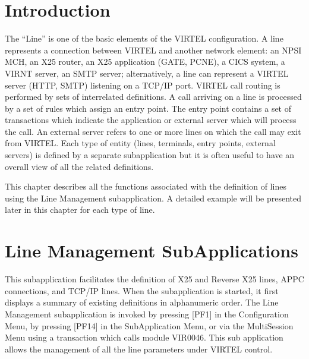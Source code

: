 \documentclass[letterpaper,10pt,english]{sphinxmanual}
\begin{document}
\section{Introduction}
\label{\detokenize{connectivity_guide:introduction}}
\sphinxAtStartPar
The “Line” is one of the basic elements of the VIRTEL configuration. A line represents a connection between VIRTEL and another network element: an NPSI MCH, an X25 router, an X25 application (GATE, PCNE), a CICS system, a VIRNT server, an SMTP server; alternatively, a line can represent a VIRTEL server (HTTP, SMTP) listening on a TCP/IP port. VIRTEL call routing is performed by sets of interrelated definitions. A call arriving on a line is processed by a set of rules which assign an entry point. The entry point contains a set of transactions which indicate the application or external server which will process the call. An external server refers to one or more lines on which the call may exit from VIRTEL. Each type of entity (lines, terminals, entry points, external servers) is defined by a separate sub\sphinxhyphen{}application but it is often useful to have an overall view of all the related definitions.

\sphinxAtStartPar
This chapter describes all the functions associated with the definition of lines using the Line Management sub\sphinxhyphen{}application. A detailed example will be presented later in
this chapter for each type of line.

\ignorespaces 

\section{Line Management Sub\sphinxhyphen{}Applications}
\label{\detokenize{connectivity_guide:line-management-sub-applications}}\label{\detokenize{connectivity_guide:index-5}}
\sphinxAtStartPar
This sub\sphinxhyphen{}application facilitates the definition of X25 and Reverse X25 lines, APPC connections, and TCP/IP lines. When the sub\sphinxhyphen{}application is started, it first displays a summary of existing definitions in alphanumeric order. The Line Management sub\sphinxhyphen{}application is invoked by pressing {[}PF1{]} in the Configuration Menu, by pressing {[}PF14{]} in the Sub\sphinxhyphen{}Application Menu, or via the Multi\sphinxhyphen{}Session Menu using a transaction which calls module VIR0046. This sub\sphinxhyphen{} application allows the management of all the line parameters under VIRTEL control.
\end{document}
